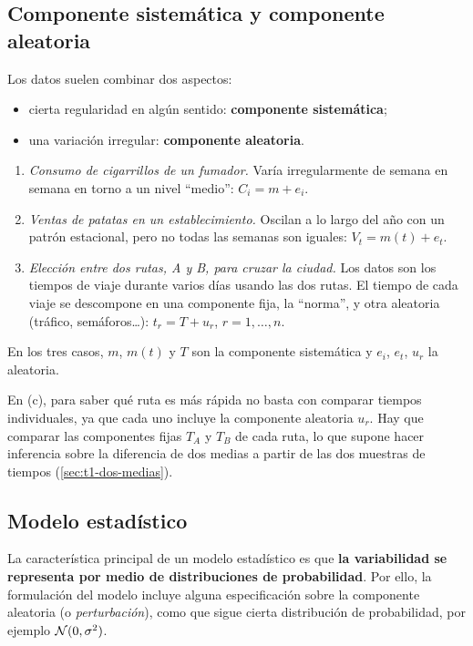 \subsection{Componente sistemática y componente aleatoria}

Los datos suelen combinar dos aspectos:
\begin{itemize}
  \item cierta regularidad en algún sentido: \textbf{componente sistemática};
  \item una variación irregular: \textbf{componente aleatoria}.
\end{itemize}

\begin{ejemplo}
  \begin{enumerate}[label=(\alph*)]
    \item \emph{Consumo de cigarrillos de un fumador.} Varía irregularmente de semana en
      semana en torno a un nivel ``medio'': $C_i = m + e_i$.
    \item \emph{Ventas de patatas en un establecimiento.} Oscilan a lo largo del año con un
      patrón estacional, pero no todas las semanas son iguales: $V_t = m(t) + e_t$.
    \item \emph{Elección entre dos rutas, A y B, para cruzar la ciudad.} Los datos son los
      tiempos de viaje durante varios días usando las dos rutas. El tiempo de cada viaje se
      descompone en una componente fija, la ``norma'', y otra aleatoria (tráfico,
      semáforos\ldots): $t_r = T + u_r$, $r=1,\ldots,n$.
  \end{enumerate}
  En los tres casos, $m$, $m(t)$ y $T$ son la componente sistemática y $e_i$, $e_t$, $u_r$ la
  aleatoria.

  En (c), para saber qué ruta es más rápida no basta con comparar tiempos individuales, ya que
  cada uno incluye la componente aleatoria $u_r$. Hay que comparar las componentes fijas $T_A$
  y $T_B$ de cada ruta, lo que supone hacer inferencia sobre la diferencia de dos medias a
  partir de las dos muestras de tiempos (\cref{sec:t1-dos-medias}).
\end{ejemplo}

\subsection{Modelo estadístico}

\begin{definicion}
  La característica principal de un modelo estadístico es que \textbf{la variabilidad se
  representa por medio de distribuciones de probabilidad}. Por ello, la formulación del
  modelo incluye alguna especificación sobre la componente aleatoria (o \emph{perturbación}),
  como que sigue cierta distribución de probabilidad, por ejemplo $\mathcal{N}(0,\sigma^2)$.
\end{definicion}

